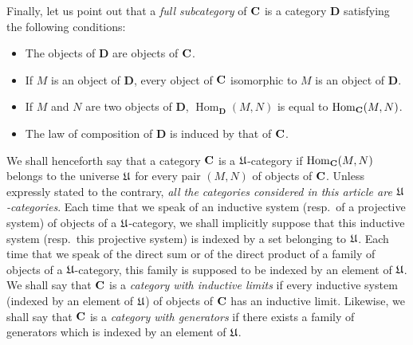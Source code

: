 Finally, let us point out that a \emph{full subcategory} of $\mathbf{C}$ is a
category $\mathbf{D}$ satisfying the following conditions:

\begin{itemize}
\item The objects of $\mathbf{D}$ are objects of $\mathbf{C}$.
\item If $M$ is an object of $\mathbf{D}$, every object of $\mathbf{C}$ isomorphic
      to $M$ is an object of $\mathbf{D}$.
\item If $M$ and $N$ are two objects of $\mathbf{D}$,
      $\operatorname{Hom}_{\mathbf{D}}(M,N)$ is equal to
      $\operatorname{Hom}_{\mathbf{C}}(M,N)$.
\item The law of composition of $\mathbf{D}$ is induced by that of $\mathbf{C}$.
\end{itemize}

We shall henceforth say that a category $\mathbf{C}$ is a
$\mathfrak{U}$-category if $\operatorname{Hom}_{\mathbf{C}}(M,N)$ belongs to the universe
$\mathfrak{U}$ for every pair $(M,N)$ of objects of $\mathbf{C}$. Unless expressly stated
to the contrary, \emph{all the categories considered in this article are
$\mathfrak{U}$-categories}. Each time that we speak of an inductive system (resp.\
of a projective system) of objects of a $\mathfrak{U}$-category, we shall implicitly
suppose that this inductive system (resp.\ this projective system) is indexed
by a set belonging to $\mathfrak{U}$. Each time that we speak of the direct sum or
of the direct product of a family of objects of a $\mathfrak{U}$-category, this
family is supposed to be indexed by an element of $\mathfrak{U}$. We shall say that
$\mathbf{C}$ is a \emph{category with inductive limits} if every inductive system
(indexed by an element of $\mathfrak{U}$) of objects of $\mathbf{C}$ has an inductive
limit. Likewise, we shall say that $\mathbf{C}$ is a \emph{category with
generators} if there exists a family of generators which is indexed by an
element of $\mathfrak{U}$.